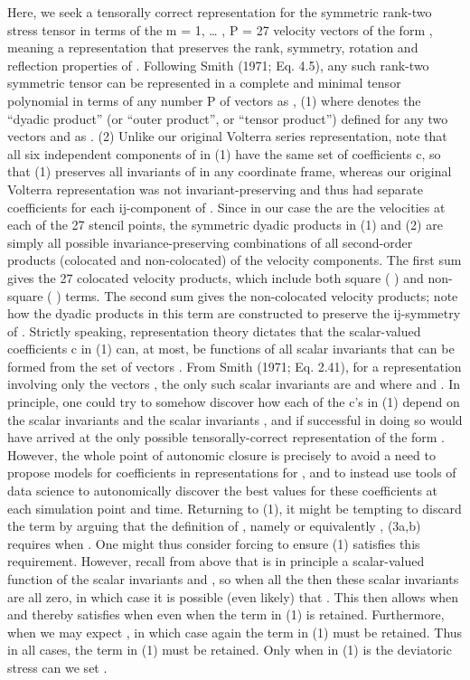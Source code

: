 Here, we seek a tensorally correct representation for the symmetric rank-two stress tensor   in terms of the m = 1, … , P = 27 velocity vectors   of the form  , meaning a representation that preserves the rank, symmetry, rotation and reflection properties of  .  Following Smith (1971; Eq. 4.5), any such rank-two symmetric tensor   can be represented in a complete and minimal tensor polynomial in terms of any number P of vectors   as
   ,                   (1)
where   denotes the “dyadic product” (or “outer product”, or “tensor product”) defined for any two vectors   and   as
     .                                               (2)
Unlike our original Volterra series representation, note that all six independent components of   in (1) have the same set of coefficients c, so that (1) preserves all invariants of   in any coordinate frame, whereas our original Volterra representation was not invariant-preserving and thus had separate coefficients for each ij-component of  .
Since in our case the   are the velocities at each of the 27 stencil points, the symmetric dyadic products in (1) and (2) are simply all possible invariance-preserving combinations of all second-order products (colocated and non-colocated) of the velocity components.  The first sum gives the 27 colocated velocity products, which include both square ( ) and non-square 
( ) terms. The second sum gives the   non-colocated velocity products; note how the dyadic products in this term are constructed to preserve the ij-symmetry of  .
Strictly speaking, representation theory dictates that the scalar-valued coefficients c in (1) can, at most, be functions of all scalar invariants that can be formed from the set of vectors  . From Smith (1971; Eq. 2.41), for a representation involving only the vectors  , the only such scalar invariants are   and   where   and  .  In principle, one could try to somehow discover how each of the c’s in (1) depend on the   scalar invariants   and the   scalar invariants  , and if successful in doing so would have arrived at the only possible tensorally-correct representation of the form  .  However, the whole point of autonomic closure is precisely to avoid a need to propose models for coefficients   in representations for  , and to instead use tools of data science to autonomically discover the best values for these coefficients at each simulation point and time. 
Returning to (1), it might be tempting to discard the term   by arguing that the definition of  , namely 
       or equivalently         ,                   (3a,b)
requires   when  . One might thus consider forcing   to ensure (1) satisfies this requirement.  However, recall from above that   is in principle a scalar-valued function   of the scalar invariants   and  , so when all the   then these scalar invariants are all zero, in which case it is possible (even likely) that  .  This then allows   when   and thereby satisfies   when   even when the   term in (1) is retained.  Furthermore, when   we may expect  , in which case again the   term in (1) must be retained.  Thus in all cases, the   term in (1) must be retained.  Only when   in (1) is the deviatoric stress can we set  .

